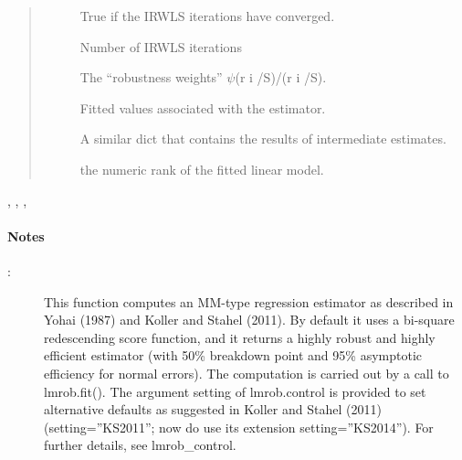 \documentclass[letterpaper,10pt,english]{sphinxmanual}
\begin{document}
\begin{fulllineitems}
\begin{quote}
\begin{description}
\begin{description}
\item[{}] \leavevmode
True if the IRWLS iterations have converged.

\item[{}] \leavevmode
Number of IRWLS iterations

\item[{}] \leavevmode
The “robustness weights” \(\psi\)(r i /S)/(r i /S).

\item[{}] \leavevmode
Fitted values associated with the estimator.

\item[{}] \leavevmode
A similar dict that contains the results of intermediate estimates.

\item[{}] \leavevmode
the numeric rank of the fitted linear model.

\end{description}

\end{description}\end{quote}




, {\hyperref[\detokenize{_modules/lmrob:lmrob.lmrob_S}]{}}, {\hyperref[\detokenize{_modules/lmrob:lmrob.lmrob_M_S}]{}}, {\hyperref[\detokenize{_modules/lmrob:lmrob.lmrob_fit}]{}}


\paragraph{Notes}
\begin{description}
\item[{:}] \leavevmode
This function computes an MM-type regression estimator as described in
Yohai (1987) and Koller and Stahel (2011). By default it uses a bi-square
redescending score function, and it returns a highly robust and highly
efficient estimator (with 50\% breakdown point and 95\% asymptotic
efficiency for normal errors). The computation is carried out by a call
to lmrob.fit(). The argument setting of lmrob.control is provided to set
alternative defaults as suggested in Koller and Stahel (2011)
(setting=”KS2011”; now do use its extension setting=”KS2014”).
For further details, see lmrob\_control.


\end{description}
\end{fulllineitems}
\end{document}
